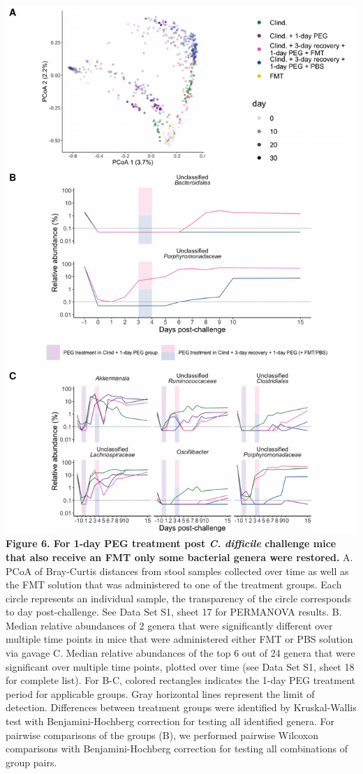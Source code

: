 \documentclass[
  11pt,
]{article}
\begin{document}
\includegraphics{figure_6.pdf} \textbf{Figure 6. For 1-day PEG treatment
post \emph{C. difficile} challenge mice that also receive an FMT only
some bacterial genera were restored.} A. PCoA of Bray-Curtis distances
from stool samples collected over time as well as the FMT solution that
was administered to one of the treatment groups. Each circle represents
an individual sample, the transparency of the circle corresponds to day
post-challenge. See Data Set S1, sheet 17 for PERMANOVA results. B.
Median relative abundances of 2 genera that were significantly different
over multiple time points in mice that were administered either FMT or
PBS solution via gavage C. Median relative abundances of the top 6 out
of 24 genera that were significant over multiple time points, plotted
over time (see Data Set S1, sheet 18 for complete list). For B-C,
colored rectangles indicates the 1-day PEG treatment period for
applicable groups. Gray horizontal lines represent the limit of
detection. Differences between treatment groups were identified by
Kruskal-Wallis test with Benjamini-Hochberg correction for testing all
identified genera. For pairwise comparisons of the groups (B), we
performed pairwise Wilcoxon comparisons with Benjamini-Hochberg
correction for testing all combinations of group pairs.
\end{document}
